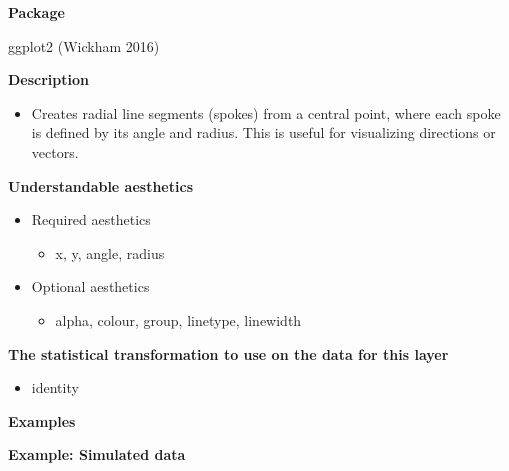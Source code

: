 \documentclass[
  letterpaper,
  DIV=11,
  numbers=noendperiod]{scrreprt}
\providecommand{\tightlist}{%
  \setlength{\itemsep}{0pt}\setlength{\parskip}{0pt}}\usepackage{longtable,booktabs,array}
\begin{document}
\textbf{Package}

ggplot2 (Wickham 2016)

\textbf{Description}

\begin{itemize}
\tightlist
\item
  Creates radial line segments (spokes) from a central point, where each
  spoke is defined by its angle and radius. This is useful for
  visualizing directions or vectors.
\end{itemize}

\textbf{Understandable aesthetics}

\begin{itemize}
\tightlist
\item
  Required aesthetics

  \begin{itemize}
  \tightlist
  \item
    x, y, angle, radius
  \end{itemize}
\item
  Optional aesthetics

  \begin{itemize}
  \tightlist
  \item
    alpha, colour, group, linetype, linewidth
  \end{itemize}
\end{itemize}

\textbf{The statistical transformation to use on the data for this
layer}

\begin{itemize}
\tightlist
\item
  identity
\end{itemize}

\textbf{Examples}

\textbf{Example: Simulated data}
\end{document}
